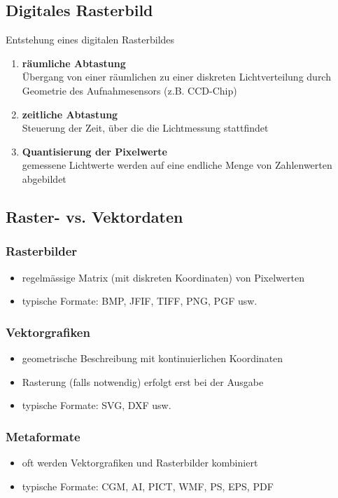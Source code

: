 \documentclass[10pt]{article}
\begin{document}
\subsection{Digitales Rasterbild}
Entstehung eines digitalen Rasterbildes
\begin{enumerate}
	\item \textbf{räumliche Abtastung} \\
		Übergang von einer räumlichen zu einer diskreten Lichtverteilung durch Geometrie des Aufnahmesensors (z.B. CCD-Chip)
	\item \textbf{zeitliche Abtastung} \\
		Steuerung der Zeit, über die die Lichtmessung stattfindet
	\item \textbf{Quantisierung der Pixelwerte}\\
		gemessene Lichtwerte werden auf eine endliche Menge von Zahlenwerten abgebildet
\end{enumerate}	

\subsection{Raster- vs. Vektordaten}
\subsubsection*{Rasterbilder}
\begin{itemize}
	\item regelmässige Matrix (mit diskreten Koordinaten) von Pixelwerten
	\item typische Formate: BMP, JFIF, TIFF, PNG, PGF usw.
\end{itemize}
\subsubsection*{Vektorgrafiken}
\begin{itemize}
	\item geometrische Beschreibung mit kontinuierlichen Koordinaten
	\item Rasterung (falls notwendig) erfolgt erst bei der Ausgabe
	\item typische Formate: SVG, DXF usw.
\end{itemize}
\subsubsection*{Metaformate}
\begin{itemize}
	\item oft werden Vektorgrafiken und Rasterbilder kombiniert
	\item typische Formate: CGM, AI, PICT, WMF, PS, EPS, PDF
\end{itemize}
\end{document}
